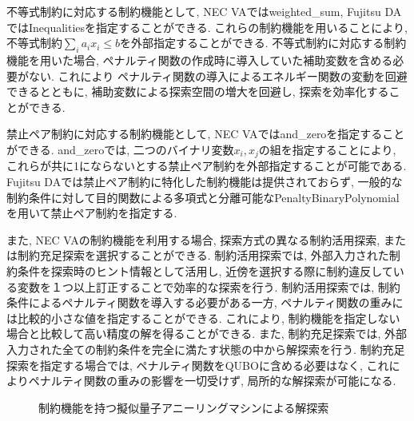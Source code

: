 \documentclass[submit,techrep,noauthor]{ipsj}
\begin{document}
不等式制約に対応する制約機能として, NEC VAではweighted\_sum, Fujitsu DAではInequalitiesを指定することができる. これらの制約機能を用いることにより, 不等式制約$\sum_{i}a_{i}x_{i}\le b$を外部指定することができる. 不等式制約に対応する制約機能を用いた場合, ペナルティ関数の作成時に導入していた補助変数を含める必要がない. これにより ペナルティ関数の導入によるエネルギー関数の変動を回避できるとともに, 補助変数による探索空間の増大を回避し, 探索を効率化することができる.

禁止ペア制約に対応する制約機能として, NEC VAではand\_zeroを指定することができる. and\_zeroでは, 二つのバイナリ変数$x_{i}, x_{j}$の組を指定することにより, これらが共に1にならないとする禁止ペア制約を外部指定することが可能である. Fujitsu DAでは禁止ペア制約に特化した制約機能は提供されておらず, 一般的な制約条件に対して目的関数による多項式と分離可能なPenaltyBinaryPolynomialを用いて禁止ペア制約を指定する.

また, NEC VAの制約機能を利用する場合, 探索方式の異なる制約活用探索, または制約充足探索を選択することができる. 制約活用探索では, 外部入力された制約条件を探索時のヒント情報として活用し, 近傍を選択する際に制約違反している変数を１つ以上訂正することで効率的な探索を行う. 制約活用探索では, 制約条件によるペナルティ関数を導入する必要がある一方, ペナルティ関数の重みには比較的小さな値を指定することができる. これにより, 制約機能を指定しない場合と比較して高い精度の解を得ることができる. また, 制約充足探索では, 外部入力された全ての制約条件を完全に満たす状態の中から解探索を行う. 制約充足探索を指定する場合では, ペナルティ関数をQUBOに含める必要はなく, これによりペナルティ関数の重みの影響を一切受けず, 局所的な解探索が可能になる.

\begin{figure}[tb]
\centering
{}
\hspace{5mm}
\caption{制約機能を持つ擬似量子アニーリングマシンによる解探索}
\label{va_search}
\end{figure}
\end{document}
